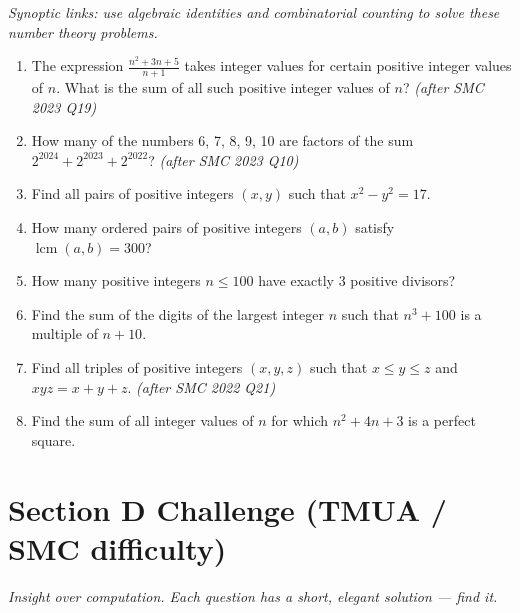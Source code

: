 \documentclass[11pt,a4paper]{article}
\begin{document}
\noindent\textit{Synoptic links: use algebraic identities and combinatorial counting to solve these number theory problems.}

\begin{enumerate}

\item The expression $\frac{n^2+3n+5}{n+1}$ takes integer values for certain positive integer values of $n$. What is the sum of all such positive integer values of $n$? \textit{\small(after SMC 2023 Q19)}

\item How many of the numbers 6, 7, 8, 9, 10 are factors of the sum $2^{2024} + 2^{2023} + 2^{2022}$? \textit{\small(after SMC 2023 Q10)}

\item Find all pairs of positive integers $(x, y)$ such that $x^2 - y^2 = 17$.

\item How many ordered pairs of positive integers $(a, b)$ satisfy $\operatorname{lcm}(a, b) = 300$?

\item How many positive integers $n \le 100$ have exactly 3 positive divisors?

\item Find the sum of the digits of the largest integer $n$ such that $n^3 + 100$ is a multiple of $n+10$.

\item Find all triples of positive integers $(x,y,z)$ such that $x \le y \le z$ and $xyz = x + y + z$. \textit{\small(after SMC 2022 Q21)}

\item Find the sum of all integer values of $n$ for which $n^2 + 4n + 3$ is a perfect square.

\end{enumerate}

\section*{Section D \quad Challenge \hfill{\normalfont\small(TMUA / SMC difficulty)}}

\noindent\textit{Insight over computation. Each question has a short, elegant solution --- find it.}
\end{document}
